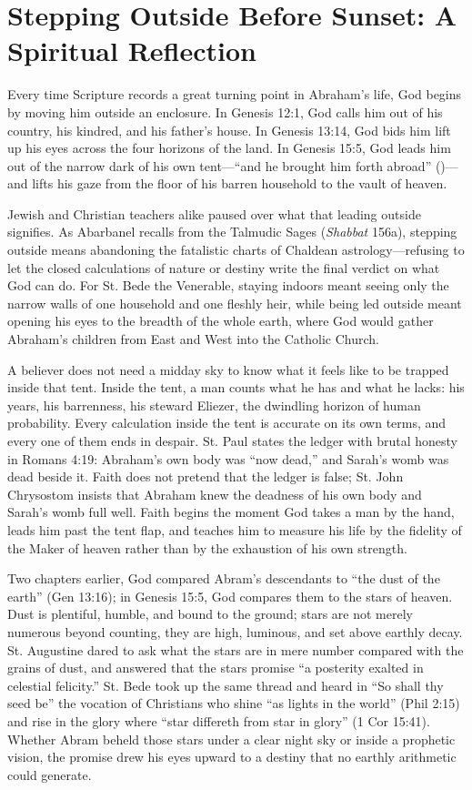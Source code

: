 \section{Stepping Outside Before Sunset: A Spiritual Reflection}

Every time Scripture records a great turning point in Abraham's life, God begins by moving him outside an enclosure. In Genesis 12:1, God calls him out of his country, his kindred, and his father's house. In Genesis 13:14, God bids him lift up his eyes across the four horizons of the land. In Genesis 15:5, God leads him out of the narrow dark of his own tent---``and he brought him forth abroad'' ()---and lifts his gaze from the floor of his barren household to the vault of heaven.

Jewish and Christian teachers alike paused over what that leading outside signifies. As Abarbanel recalls from the Talmudic Sages (\emph{Shabbat} 156a), stepping outside means abandoning the fatalistic charts of Chaldean astrology---refusing to let the closed calculations of nature or destiny write the final verdict on what God can do. For St. Bede the Venerable, staying indoors meant seeing only the narrow walls of one household and one fleshly heir, while being led outside meant opening his eyes to the breadth of the whole earth, where God would gather Abraham's children from East and West into the Catholic Church.

A believer does not need a midday sky to know what it feels like to be trapped inside that tent. Inside the tent, a man counts what he has and what he lacks: his years, his barrenness, his steward Eliezer, the dwindling horizon of human probability. Every calculation inside the tent is accurate on its own terms, and every one of them ends in despair. St. Paul states the ledger with brutal honesty in Romans 4:19: Abraham's own body was ``now dead,'' and Sarah's womb was dead beside it. Faith does not pretend that the ledger is false; St. John Chrysostom insists that Abraham knew the deadness of his own body and Sarah's womb full well. Faith begins the moment God takes a man by the hand, leads him past the tent flap, and teaches him to measure his life by the fidelity of the Maker of heaven rather than by the exhaustion of his own strength.

Two chapters earlier, God compared Abram's descendants to ``the dust of the earth'' (Gen 13:16); in Genesis 15:5, God compares them to the stars of heaven. Dust is plentiful, humble, and bound to the ground; stars are not merely numerous beyond counting, they are high, luminous, and set above earthly decay. St. Augustine dared to ask what the stars are in mere number compared with the grains of dust, and answered that the stars promise ``a posterity exalted in celestial felicity.'' St. Bede took up the same thread and heard in ``So shall thy seed be'' the vocation of Christians who shine ``as lights in the world'' (Phil 2:15) and rise in the glory where ``star differeth from star in glory'' (1 Cor 15:41). Whether Abram beheld those stars under a clear night sky or inside a prophetic vision, the promise drew his eyes upward to a destiny that no earthly arithmetic could generate.


